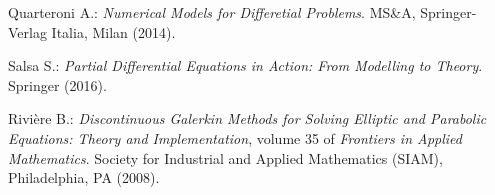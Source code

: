 \documentclass[12pt, a4paper]{article}
\theoremstyle{definition}
\theoremstyle{plain}
\theoremstyle{plain}
\begin{document}
\begin{thebibliography}{99}
	Quarteroni A.: \emph{Numerical Models for Differetial Problems}. MS\&A, Springer-Verlag Italia, Milan (2014).
	
	Salsa S.: \emph{Partial Differential Equations in Action: From Modelling to Theory}. Springer (2016).
	
	Rivière B.: \emph{Discontinuous Galerkin Methods for Solving Elliptic and Parabolic Equations: Theory and Implementation}, volume 35 of \emph{Frontiers in Applied Mathematics}. Society for Industrial and Applied Mathematics (SIAM), Philadelphia, PA (2008).
\end{thebibliography}
\end{document}
